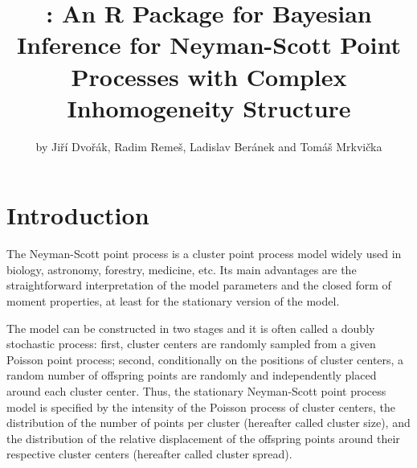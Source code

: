 
\title{: An R Package for Bayesian Inference for Neyman-Scott Point Processes with Complex Inhomogeneity Structure}
\author{by Jiří Dvořák, Radim Remeš, Ladislav Beránek and Tomáš Mrkvička}

\maketitle



\section{Introduction}
The Neyman-Scott point process \citep{NeymanScott1958} is a cluster point process model widely used in biology, astronomy, forestry, medicine, etc. Its main advantages are the straightforward interpretation of the model parameters and the closed form of moment properties, at least for the stationary version of the model.

The model can be constructed in two stages and it is often called a doubly stochastic process: first, cluster centers are randomly sampled from a given Poisson point process; second, conditionally on the positions of cluster centers, a random number of offspring points are randomly and independently placed around each cluster center. Thus, the stationary Neyman-Scott point process model is specified by the intensity of the Poisson process of cluster centers, the distribution of the number of points per cluster (hereafter called cluster size), and the distribution of the relative displacement of the offspring points around their respective cluster centers (hereafter called cluster spread).

